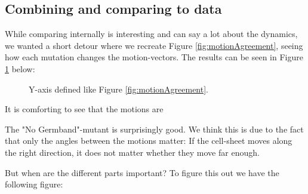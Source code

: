 \subsection{Combining and comparing to data}
While comparing internally is interesting and can say a lot about the dynamics, we wanted a short detour where we recreate Figure \ref{fig:motionAgreement}, seeing how each mutation changes the motion-vectors. The results can be seen in Figure \ref{fig:compare-motionAgreement} below:

\begin{figure}[H]
    \centering
    \caption{ Y-axis defined like Figure \ref{fig:motionAgreement}. }
    \label{fig:compare-motionAgreement}
\end{figure}
It is comforting to see that the motions are 

The "No Germband"-mutant is surprisingly good. We think this is due to the fact that only the angles between the motions matter: If the cell-sheet moves along the right direction, it does not matter whether they move far enough.   

But when are the different parts important? To figure this out we have the following figure:

